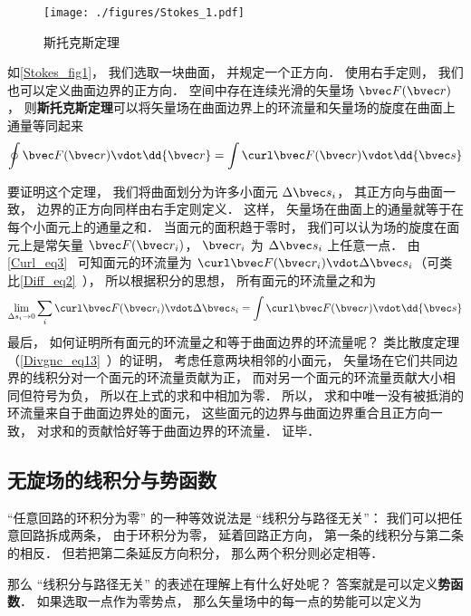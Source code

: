 
\begin{issues}
\issueTODO
\end{issues}


\begin{figure}[ht]
\centering
\texttt{[image: ./figures/Stokes\_1.pdf]}
\caption{斯托克斯定理} \label{Stokes_fig1}
\end{figure}

如\autoref{Stokes_fig1}， 我们选取一块曲面， 并规定一个正方向． 使用右手定则， 我们也可以定义曲面边界的正方向． 空间中存在连续光滑的矢量场 $\bvec F(\bvec r)$， 则\textbf{斯托克斯定理}可以将矢量场在曲面边界上的环流量和矢量场的旋度在曲面上通量等同起来
\begin{equation}\label{Stokes_eq1}
\oint \bvec F(\bvec r) \vdot \dd{\bvec r} = \int \curl \bvec F(\bvec r) \vdot \dd{\bvec s}
\end{equation}

要证明这个定理， 我们将曲面划分为许多小面元 $\Delta \bvec s_i$， 其正方向与曲面一致， 边界的正方向同样由右手定则定义． 这样， 矢量场在曲面上的通量就等于在每个小面元上的通量之和． 当面元的面积趋于零时， 我们可以认为场的旋度在面元上是常矢量 $\bvec F(\bvec r_i)$， $\bvec r_i$ 为 $\Delta \bvec s_i$ 上任意一点． 由\autoref{Curl_eq3}~ 可知面元的环流量为 $\curl\bvec F(\bvec r_i) \vdot \Delta \bvec s_i$（可类比\autoref{Diff_eq2}~）， 所以根据积分的思想， 所有面元的环流量之和为
\begin{equation}
\lim_{\Delta s_i \to 0}\sum_i \curl\bvec F(\bvec r_i) \vdot \Delta \bvec s_i = \int \curl\bvec F(\bvec r) \vdot \dd{\bvec s}
\end{equation}
最后， 如何证明所有面元的环流量之和等于曲面边界的环流量呢？ 类比散度定理（\autoref{Divgnc_eq13}~）的证明， 考虑任意两块相邻的小面元， 矢量场在它们共同边界的线积分对一个面元的环流量贡献为正， 而对另一个面元的环流量贡献大小相同但符号为负， 所以在上式的求和中相加为零． 所以， 求和中唯一没有被抵消的环流量来自于曲面边界处的面元， 这些面元的边界与曲面边界重合且正方向一致， 对求和的贡献恰好等于曲面边界的环流量． 证毕．


\subsection{无旋场的线积分与势函数}
“任意回路的环积分为零” 的一种等效说法是 “线积分与路径无关”： 我们可以把任意回路拆成两条， 由于环积分为零， 延着回路正方向， 第一条的线积分与第二条的相反． 但若把第二条延反方向积分， 那么两个积分则必定相等．

那么 “线积分与路径无关” 的表述在理解上有什么好处呢？ 答案就是可以定义\textbf{势函数}． 如果选取一点作为零势点， 那么矢量场中的每一点的势能可以定义为
